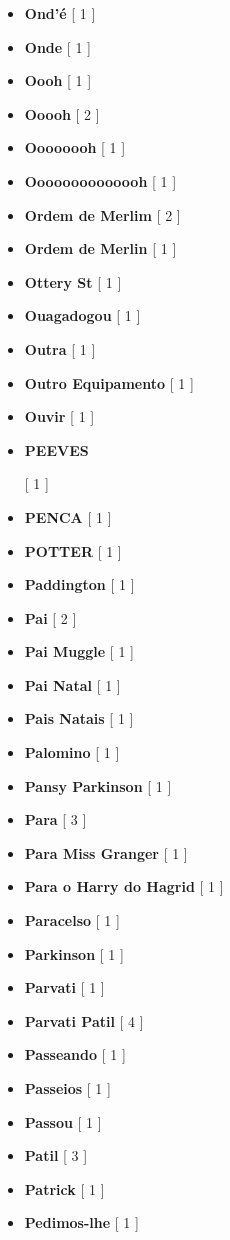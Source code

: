\documentclass[a4paper]{article}
\begin{document}
\begin{itemize}
	\item \textbf{Ond'é} [ 1 ]
	\item \textbf{Onde} [ 1 ]
	\item \textbf{Oooh} [ 1 ]
	\item \textbf{Ooooh} [ 2 ]
	\item \textbf{Oooooooh} [ 1 ]
	\item \textbf{Oooooooooooooh} [ 1 ]
	\item \textbf{Ordem de Merlim} [ 2 ]
	\item \textbf{Ordem de Merlin} [ 1 ]
	\item \textbf{Ottery St} [ 1 ]
	\item \textbf{Ouagadogou} [ 1 ]
	\item \textbf{Outra} [ 1 ]
	\item \textbf{Outro Equipamento} [ 1 ]
	\item \textbf{Ouvir} [ 1 ]
	\item \hypertarget{P}{\textbf{PEEVES}} [ 1 ]
	\item \textbf{PENCA} [ 1 ]
	\item \textbf{POTTER} [ 1 ]
	\item \textbf{Paddington} [ 1 ]
	\item \textbf{Pai} [ 2 ]
	\item \textbf{Pai Muggle} [ 1 ]
	\item \textbf{Pai Natal} [ 1 ]
	\item \textbf{Pais Natais} [ 1 ]
	\item \textbf{Palomino} [ 1 ]
	\item \textbf{Pansy Parkinson} [ 1 ]
	\item \textbf{Para} [ 3 ]
	\item \textbf{Para Miss Granger} [ 1 ]
	\item \textbf{Para o Harry do Hagrid} [ 1 ]
	\item \textbf{Paracelso} [ 1 ]
	\item \textbf{Parkinson} [ 1 ]
	\item \textbf{Parvati} [ 1 ]
	\item \textbf{Parvati Patil} [ 4 ]
	\item \textbf{Passeando} [ 1 ]
	\item \textbf{Passeios} [ 1 ]
	\item \textbf{Passou} [ 1 ]
	\item \textbf{Patil} [ 3 ]
	\item \textbf{Patrick} [ 1 ]
	\item \textbf{Pedimos-lhe} [ 1 ]

\end{itemize}
\end{document}
